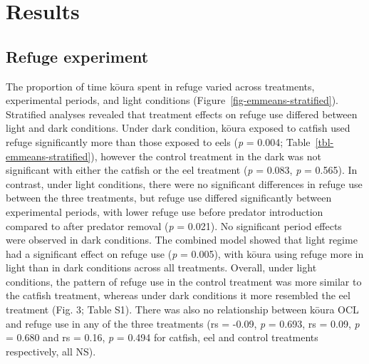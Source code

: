 \documentclass[
  12pt,
  a4paper,
  oneside]{scrbook}
\begin{document}
\section{Results}\label{results}

\subsection{Refuge experiment}\label{refuge-experiment-1}

The proportion of time kōura spent in refuge varied across treatments,
experimental periods, and light conditions
(Figure~\ref{fig-emmeans-stratified}). Stratified analyses revealed that
treatment effects on refuge use differed between light and dark
conditions. Under dark condition, kōura exposed to catfish used refuge
significantly more than those exposed to eels (\emph{p} = 0.004;
Table~\ref{tbl-emmeans-stratified}), however the control treatment in
the dark was not significant with either the catfish or the eel
treatment (\emph{p} = 0.083, \emph{p} = 0.565). In contrast, under light
conditions, there were no significant differences in refuge use between
the three treatments, but refuge use differed significantly between
experimental periods, with lower refuge use before predator introduction
compared to after predator removal (\emph{p} = 0.021). No significant
period effects were observed in dark conditions. The combined model
showed that light regime had a significant effect on refuge use
(\emph{p} = 0.005), with kōura using refuge more in light than in dark
conditions across all treatments. Overall, under light conditions, the
pattern of refuge use in the control treatment was more similar to the
catfish treatment, whereas under dark conditions it more resembled the
eel treatment (Fig. 3; Table S1). There was also no relationship between
kōura OCL and refuge use in any of the three treatments (rs = -0.09,
\emph{p} = 0.693, rs = 0.09, \emph{p} = 0.680 and rs = 0.16, \emph{p} =
0.494 for catfish, eel and control treatments respectively, all NS).
\end{document}
